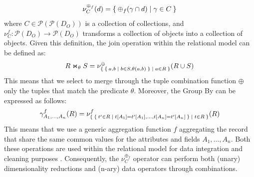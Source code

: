 \begin{equation}\label{def:nestingfirst}
\nu_C^{\oplus_f}(d)=\Set{\oplus_f(\gamma\cap d)|\gamma\in C}
\end{equation}
where $C\in \mathcal{P}(\mathcal{P}(D_O))$ is a collection of collections, and $\nu_C^f\colon \mathcal{P}(D_O)\to \mathcal{P}(D_O)$ transforms a collection of objects into a collection of objects. Given this definition, the join operation within the relational model can be defined as:
\[R\Join_\theta S=\nu^\oplus_{\Set{\Set{a,b|b\in S, \theta(a,b)}|a\in R}}(R\cup S)\]
This means that we select to merge through the tuple combination function $\oplus$ only the tuples that match the predicate $\theta$. Moreover, the Group By can be expressed as follows:
\[\gamma^f_{A_1,\dots,A_n}(R)=\nu^f_{\Set{\Set{t'\in R|t[A_1]=t'[A_1],\dots,t[A_n]=t'[A_n]}|t\in R}}(R)\]
This means that we use a generic aggregation function $f$ aggregating the record that share the same common values for the attributes and fields $A_1,\dots,A_n$. Both these operations are used within the relational model for data integration and cleaning purposes \cite{deII}. Consequently, the $\nu_C^{\oplus_f}$ operator can perform both (unary) dimensionality reductions and (n-ary) data operators through combinations. 
